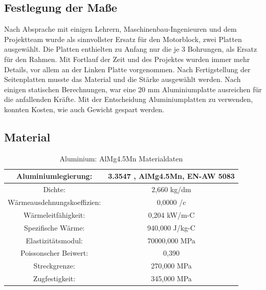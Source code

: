 \subsection{Festlegung der Maße}

Nach Absprache mit einigen Lehrern, Maschinenbau-Ingenieuren und dem Projektteam wurde als sinnvollster Ersatz für den Motorblock, zwei Platten ausgewählt. Die Platten enthielten zu Anfang nur die je 3 Bohrungen, als Ersatz für den Rahmen. Mit Fortlauf der Zeit und des Projektes wurden immer mehr Details, vor allem an der Linken Platte vorgenommen. Nach Fertigstellung der Seitenplatten musste das Material und die Stärke ausgewählt werden. Nach einigen statischen Berechnungen, war eine 20 mm Aluminiumplatte ausreichen für die anfallenden Kräfte. Mit der Entscheidung Aluminiumplatten zu verwenden, konnten Kosten, wie auch Gewicht gespart werden.

\subsection{Material}
\begin{table} [H]
	\begin{center}
		\begin{tabular}{|c|c|}
		\hline
		Aluminiumlegierung:			& 3.3547 ,  AlMg4.5Mn, EN-AW 5083 \\ \hline
		Dichte:						& 2,660 kg/dm		\\ \hline
		Wärmeausdehnungskoeffizien:	& 0,0000 /c			\\ \hline
		Wärmeleitfähigkeit:			& 0,204 kW/m-C		\\ \hline
		Spezifische Wärme:			& 940,000 J/kg-C	\\ \hline
		Elastizitätsmodul:			& 70000,000 MPa		\\ \hline
		Poissonscher Beiwert:		& 0,390				\\ \hline
		Streckgrenze:				& 270,000 MPa		\\ \hline
		Zugfestigkeit:				& 345,000 MPa		\\ \hline
		\end{tabular}
		\caption{Aluminium: AlMg4.5Mn Materialdaten}
	\end{center}
\end{table}


